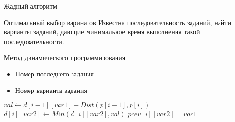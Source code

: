 \documentclass{beamer}
\begin{document}
\begin{frame}{Жадный алгоритм}

\end{frame}

\begin{frame}{Оптимальный выбор варинатов}
Известна последовательность заданий, найти варианты заданий, дающие минимальное время выполнения такой последовательности.

Метод динамического программирования
\begin{itemize}
\item Номер последнего задания
\item Номер варианта задания
\end{itemize}

\begin{algorithmic}
\State $val \gets d[i - 1][var1] + Dist(p[i - 1], p[i])$
    \State $d[i][var2] \gets Min(d[i][var2], val)$
    \State $prev[i][var2] = var1$
\EndIf
\end{algorithmic}

\end{frame}
\end{document}
